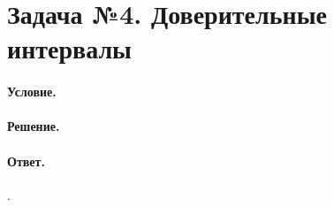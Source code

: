 
\section{Задача №4. Доверительные интервалы}

\paragraph{Условие.} 
\paragraph{Решение.}

\paragraph{Ответ.}.